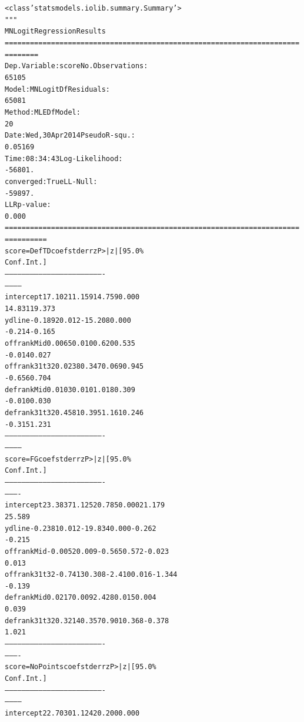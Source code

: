 \documentclass[letterpaper,10pt,english]{/anaconda/lib/python2.7/site-packages/sphinx/texinputs/sphinxhowto}
\newenvironment{InvisibleVerbatim}
        {\begin{mdframed}[leftmargin=0.1\linewidth,innerleftmargin=3pt,innerrightmargin=3pt, userdefinedwidth=1\linewidth, linewidth=0pt, linecolor=white, usetwoside=false]}
        {\end{mdframed}}
\begin{document}
                \vspace{-2.55\baselineskip}\begin{InvisibleVerbatim}
                \vspace{-0.5\baselineskip}
\begin{alltt}<class 'statsmodels.iolib.summary.Summary'>
"""
                          MNLogit Regression Results
======================================================================
========
Dep. Variable:                  score   No. Observations:
65105
Model:                        MNLogit   Df Residuals:
65081
Method:                           MLE   Df Model:
20
Date:                Wed, 30 Apr 2014   Pseudo R-squ.:
0.05169
Time:                        08:34:43   Log-Likelihood:
-56801.
converged:                       True   LL-Null:
-59897.
                                        LLR p-value:
0.000
======================================================================
==========
   score=DefTD       coef    std err          z      P>|z|      [95.0\%
Conf. Int.]
----------------------------------------------------------------------
------------
intercept         17.1021      1.159     14.759      0.000
14.831    19.373
ydline            -0.1892      0.012    -15.208      0.000
-0.214    -0.165
offrankMid         0.0065      0.010      0.620      0.535
-0.014     0.027
offrank31t32       0.0238      0.347      0.069      0.945
-0.656     0.704
defrankMid         0.0103      0.010      1.018      0.309
-0.010     0.030
defrank31t32       0.4581      0.395      1.161      0.246
-0.315     1.231
----------------------------------------------------------------------
------------
    score=FG       coef    std err          z      P>|z|      [95.0\%
Conf. Int.]
----------------------------------------------------------------------
----------
intercept       23.3837      1.125     20.785      0.000        21.179
25.589
ydline          -0.2381      0.012    -19.834      0.000        -0.262
-0.215
offrankMid      -0.0052      0.009     -0.565      0.572        -0.023
0.013
offrank31t32    -0.7413      0.308     -2.410      0.016        -1.344
-0.139
defrankMid       0.0217      0.009      2.428      0.015         0.004
0.039
defrank31t32     0.3214      0.357      0.901      0.368        -0.378
1.021
----------------------------------------------------------------------
----------
score=NoPoints       coef    std err          z      P>|z|      [95.0\%
Conf. Int.]
----------------------------------------------------------------------
------------
intercept         22.7030      1.124     20.200      0.000

\end{alltt}
\end{InvisibleVerbatim}
\end{document}
